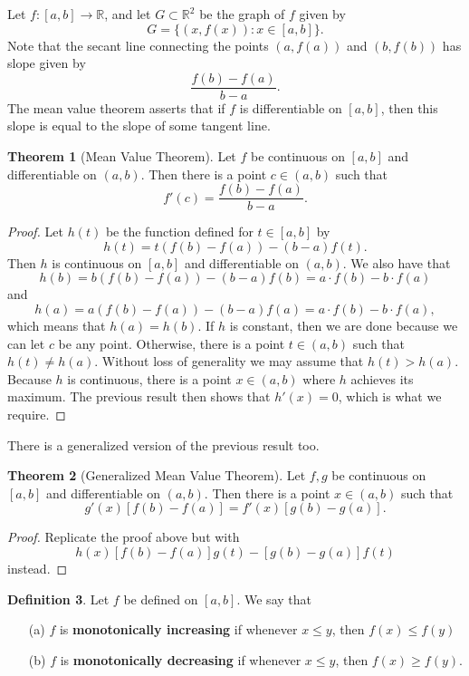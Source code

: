 \documentclass[12pt]{article}
\theoremstyle{definition}
\newtheorem{definition}{Definition}
\theoremstyle{theorem}
\newtheorem{theorem}[definition]{Theorem}
\begin{document}
Let $f : [a,b] \to \mathbb{R}$, and let $G \subset \mathbb{R}^2$ be the graph of $f$ given by  
\[
G = \{(x, f(x)) : x \in [a,b]\}.
\]
Note that the secant line connecting the points $(a,f(a))$ and $(b,f(b))$ has slope given by 
\[
\frac{f(b) - f(a)}{b - a}.
\]
The mean value theorem asserts that if $f$ is differentiable on $[a,b]$, then this slope is equal to the slope of some tangent line. 

\begin{theorem}[Mean Value Theorem]
Let $f$ be continuous on $[a,b]$ and differentiable on $(a,b)$. Then there is a point $c \in (a,b)$ such that 
\[
f'(c) = \frac{f(b)-f(a)}{b-a}.
\]
\end{theorem}

\begin{proof}
Let $h(t)$ be the function defined for $t \in [a,b]$ by 
\[
h(t) = t (f(b) - f(a)) - (b-a)f(t).
\]
Then $h$ is continuous on $[a,b]$ and differentiable on $(a,b)$. We also have that 
\[
h(b) = b(f(b) - f(a)) - (b-a)f(b) = a \cdot f(b) - b \cdot f(a)
\]
and 
\[
h(a) = a(f(b) - f(a)) - (b-a)f(a) = a \cdot f(b) - b \cdot f(a),
\]
which means that $h(a) = h(b)$.  If $h$ is constant, then we are done because we can let $c$ be any point. Otherwise, there is a point $t \in (a,b)$ such that $h(t) \ne h(a)$. Without loss of generality we may assume that $h(t) > h(a)$. Because $h$ is continuous, there is a point $x \in (a,b)$ where $h$ achieves its maximum. The previous result then shows that $h'(x) = 0$, which is what we require. 
\end{proof}

There is a generalized version of the previous result too. 

\begin{theorem}[Generalized Mean Value Theorem]
Let $f, g$ be continuous on $[a,b]$ and differentiable on $(a,b)$. Then there is a point $x \in (a,b)$ such that 
\[
g'(x) [f(b) - f(a)] = f'(x)[g(b) - g(a)].
\]
\end{theorem}

\begin{proof}
Replicate the proof above but with 
\[
h(x) [f(b) - f(a)]g(t) - [g(b) - g(a)]f(t)
\]
instead. 
\end{proof}

\begin{definition}
Let $f$ be defined on $[a,b]$. We say that 
\begin{enumerate}
\item[(a)] $f$ is \textbf{monotonically increasing} if whenever $x \leqslant y$, then $f(x) \leqslant f(y)$
\item[(b)] $f$ is \textbf{monotonically decreasing} if whenever $x \leqslant y$, then $f(x) \geqslant f(y)$.
\end{enumerate}
\end{definition}
\end{document}
